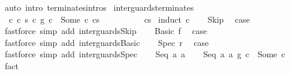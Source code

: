 \begin{isabellebody}
\isamarkupfalse%
\ {\isacharparenleft}auto\ intro{\isacharcolon}\ terminates{\isachardot}intros{\isacharparenright}%
\endisatagproof
{\isafoldproof}%
%
\isadelimproof
%
\endisadelimproof
%
\isamarkuptrue%
\isamarkupfalse%
\ inter{\isacharunderscore}guards{\isacharunderscore}terminates{\isacharcolon}\ \isanewline
\ \ {\isachardoublequoteopen}{\isasymAnd}c\ c{}\ s{\isachardot}\ {\isasymlbrakk}{\isacharparenleft}c{}\ {\isasyminter}\isactrlsub g\ c{}{\isacharparenright}\ {\isacharequal}\ Some\ c{\isacharsemicolon}\ {\isasymGamma}{\isasymturnstile}c{}{\isasymdown}s\ {\isasymrbrakk}\isanewline
\ \ \ \ \ \ \ \ {\isasymLongrightarrow}\ {\isasymGamma}{\isasymturnstile}c{\isasymdown}s{\isachardoublequoteclose}\isanewline
%
\isadelimproof
%
\endisadelimproof
%
\isatagproof
{}\isamarkupfalse%
\ {\isacharparenleft}induct\ c{}{\isacharparenright}\isanewline
\ \ \isamarkupfalse%
\ Skip\ \isamarkupfalse%
\ {\isacharquery}case\ \isamarkupfalse%
\ {\isacharparenleft}fastforce\ simp\ add{\isacharcolon}\ inter{\isacharunderscore}guards{\isacharunderscore}Skip{\isacharparenright}\isanewline
{}\isamarkupfalse%
\isanewline
\ \ \isamarkupfalse%
\ {\isacharparenleft}Basic\ f{\isacharparenright}\ \isamarkupfalse%
\ {\isacharquery}case\ \isamarkupfalse%
\ {\isacharparenleft}fastforce\ simp\ add{\isacharcolon}\ inter{\isacharunderscore}guards{\isacharunderscore}Basic{\isacharparenright}\isanewline
{}\isamarkupfalse%
\isanewline
\ \ \isamarkupfalse%
\ {\isacharparenleft}Spec\ r{\isacharparenright}\ \isamarkupfalse%
\ {\isacharquery}case\ \isamarkupfalse%
\ {\isacharparenleft}fastforce\ simp\ add{\isacharcolon}\ inter{\isacharunderscore}guards{\isacharunderscore}Spec{\isacharparenright}\isanewline
{}\isamarkupfalse%
\isanewline
\ \ \isamarkupfalse%
\ {\isacharparenleft}Seq\ a{}\ a{}{\isacharparenright}\isanewline
\ \ \isamarkupfalse%
\ {\isachardoublequoteopen}{\isacharparenleft}Seq\ a{}\ a{}\ {\isasyminter}\isactrlsub g\ c{}{\isacharparenright}\ {\isacharequal}\ Some\ c{\isachardoublequoteclose}\ \isamarkupfalse%
\ fact\isanewline
\ \ \isamarkupfalse%

\end{isabellebody}
